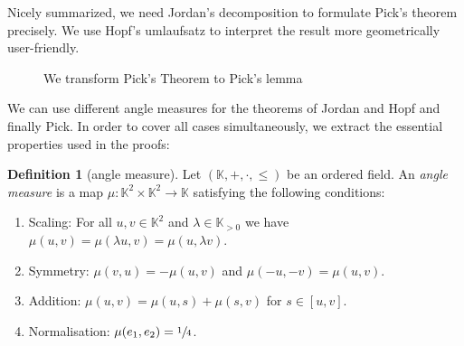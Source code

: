 \documentclass[a4paper]{amsart}
\numberwithin{equation}{section}
\theoremstyle{plain}
\theoremstyle{definition}
\newtheorem{definition}[theorem]{Definition}
\newcommand{\K}{\mathbb{K}}
\begin{document}
Nicely summarized, we need Jordan's decomposition
to formulate Pick's theorem precisely.
We use Hopf's umlaufsatz to interpret
the result more geometrically user-friendly.

\begin{figure}[ht]
  \caption{We transform Pick's Theorem to Pick's lemma}
  \label{fig:PickTransform}
\end{figure}



We can use different angle measures for the theorems of
Jordan and Hopf and finally Pick.
In order to cover all cases simultaneously, 
we extract the essential properties used in the proofs:

\begin{definition}[angle measure\label{def:AngleMeasure}]
  Let $(\K,+,\cdot,\le)$ be an ordered field.
  An \emph{angle measure} is a map $\mu \colon \K^2 \times \K^2 \to \K$
  satisfying the following conditions:
  \begin{enumerate}
  \item
    Scaling: For all $u,v \in \K^2$ and $\lambda \in \K_{>0}$
    we have $\mu(u,v) = \mu(\lambda u, v) = \mu(u, \lambda v)$.
  \item
    Symmetry: $\mu(v,u) = -\mu(u,v)$ and $\mu(-u,-v) = \mu(u,v)$.
  \item
    Addition: $\mu(u,v) = \mu(u,s) + \mu(s,v)$ for $s \in [u,v]$.
  \item
    Normalisation: $\mu(e_1,e_2) = \sfrac{1}{4}$.
  \end{enumerate}
\end{definition}
\end{document}

